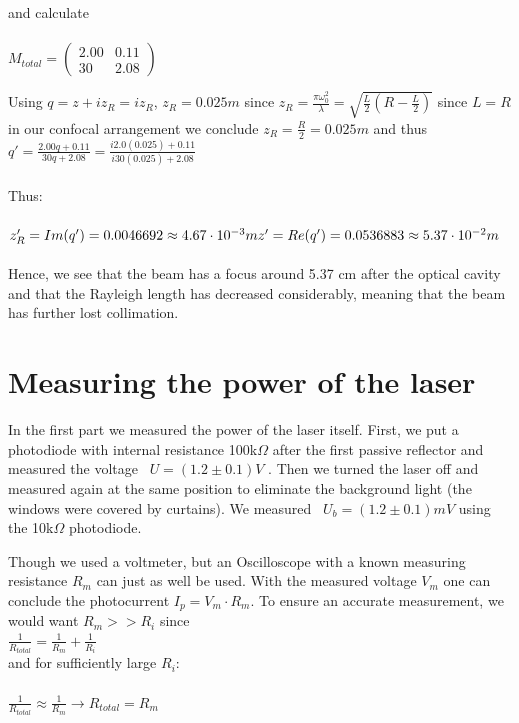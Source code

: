 \documentclass{article}
\begin{document}
and calculate
\\\\
$M_{total}= \begin{pmatrix}
2.00 & 0.11\\
30 & 2.08
\end{pmatrix}
$

Using $q = z+iz_R = iz_R$, $z_R = 0.025m$ since $z_R = \frac{\pi \omega^2_0}{\lambda} = \sqrt{\frac{L}{2}(R-\frac{L}{2})}$ since $L=R$ in our confocal arrangement we conclude $z_R=\frac{R}{2}=0.025m$ and thus $q' = \frac{2.00q+0.11}{30q+2.08} = \frac{i2.0(0.025)+0.11}{i30(0.025)+2.08}$
\\\\
Thus:
\\\\
$z'_R = Im(q') = 0.0046692 \approx 4.67\cdot10^{-3}m
\\\\
z' = Re(q') =  0.0536883 \approx 5.37\cdot10^{-2}m
$
\\\\
Hence, we see that the beam has a focus around 5.37 cm after the optical cavity and that the Rayleigh length has decreased considerably, meaning that the beam has further lost collimation.


\section{Measuring the power of the laser}

In the first part we measured the power of the laser itself. First, we put a photodiode with internal resistance 100k$\Omega$
after the first passive reflector and measured the voltage
\ $U=(1.2 \pm 0.1) V$ %
. Then we turned the laser off and measured again at the same position to eliminate the background light (the windows were covered by curtains). We measured 
\ $U_b = (1.2 \pm 0.1)mV$ 
using the 
10k$\Omega$
photodiode. 


Though we used a voltmeter, but an Oscilloscope with a known measuring resistance $R_m$ can just as well be used. With the measured voltage $V_m$ one can conclude the photocurrent $I_p = V_m \cdot R_m$. To ensure an accurate measurement, we would want $R_m >>R_i$ since\\

$\frac{1}{R_{total}}= \frac{1}{R_m}+\frac{1}{R_i}$\\

and for sufficiently large $R_i$:\\
$\hspace{3cm}$\\
$\frac{1}{R_{total}} \approx \frac{1}{R_m} \rightarrow R_{total} = R_m$\\
\end{document}
